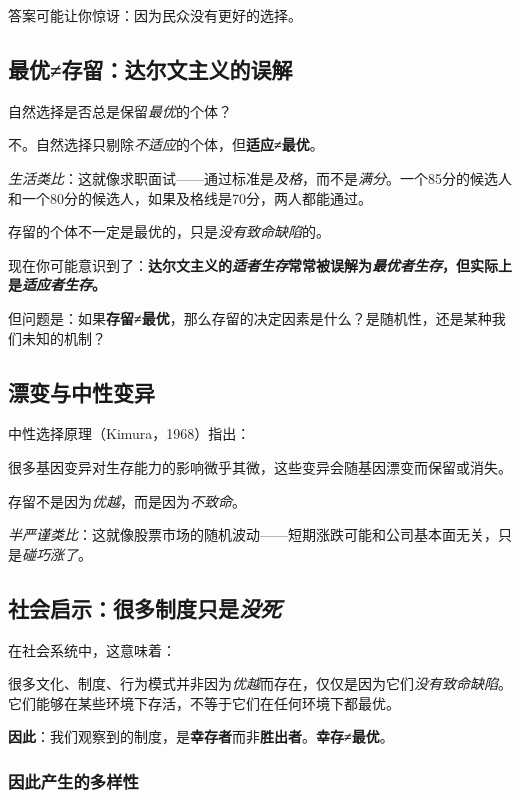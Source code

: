 \documentclass[openany, a4paper, 12pt]{book}
\begin{document}
	答案可能让你惊讶：因为民众没有更好的选择。

	\subsection{最优≠存留：达尔文主义的误解}

	自然选择是否总是保留\textit{最优}的个体？

	不。自然选择只剔除\textit{不适应}的个体，但\textbf{适应≠最优}。

	\textit{生活类比}：这就像求职面试——通过标准是\textit{及格}，而不是\textit{满分}。一个85分的候选人和一个80分的候选人，如果及格线是70分，两人都能通过。

	存留的个体不一定是最优的，只是\textit{没有致命缺陷}的。

	\begin{tcolorbox}[colback=yellow!5, title=\textit{读者行为预测}]
		现在你可能意识到了：\textbf{达尔文主义的\textit{适者生存}常常被误解为\textit{最优者生存}，但实际上是\textit{适应者生存}。}
	\end{tcolorbox}

	但问题是：如果\textbf{存留≠最优}，那么存留的决定因素是什么？是随机性，还是某种我们未知的机制？

	\subsection{漂变与中性变异}

	中性选择原理（Kimura，1968）指出：

	很多基因变异对生存能力的影响微乎其微，这些变异会随基因漂变而保留或消失。

	存留不是因为\textit{优越}，而是因为\textit{不致命}。

	\textit{半严谨类比}：这就像股票市场的随机波动——短期涨跌可能和公司基本面无关，只是\textit{碰巧涨了}。

	\subsection{社会启示：很多制度只是\textit{没死}}

	在社会系统中，这意味着：

	很多文化、制度、行为模式并非因为\textit{优越}而存在，仅仅是因为它们\textit{没有致命缺陷}。它们能够在某些环境下存活，不等于它们在任何环境下都最优。

	\textbf{\Large 因此}：我们观察到的制度，是\textbf{幸存者}而非\textbf{胜出者}。\textbf{幸存≠最优}。
	
	\subsubsection{因此产生的多样性}
\end{document}
